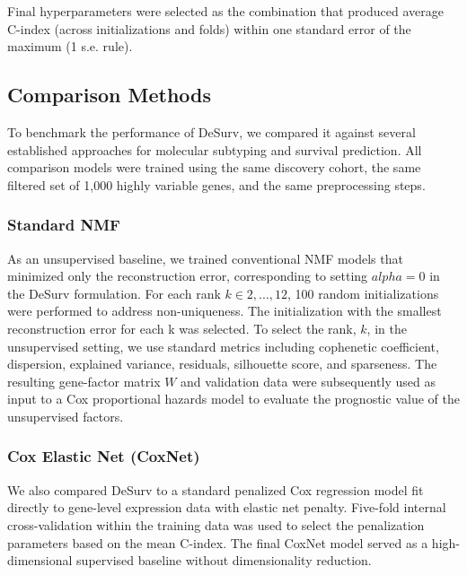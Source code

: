\documentclass[9pt,twocolumn,twoside,]{pnas-new}
\begin{document}
Final hyperparameters were selected as the combination that produced
average C-index (across initializations and folds) within one standard
error of the maximum (1 s.e. rule).

\subsection*{Comparison Methods}\label{comparison-methods}

To benchmark the performance of DeSurv, we compared it against several
established approaches for molecular subtyping and survival prediction.
All comparison models were trained using the same discovery cohort, the
same filtered set of 1,000 highly variable genes, and the same
preprocessing steps.

\subsubsection*{Standard NMF}\label{standard-nmf}

As an unsupervised baseline, we trained conventional NMF models that
minimized only the reconstruction error, corresponding to setting
\(alpha=0\) in the DeSurv formulation. For each rank
\(k \in {2,...,12}\), 100 random initializations were performed to
address non-uniqueness. The initialization with the smallest
reconstruction error for each k was selected. To select the rank, \(k\),
in the unsupervised setting, we use standard metrics including
cophenetic coefficient, dispersion, explained variance, residuals,
silhouette score, and sparseness. The resulting gene-factor matrix \(W\)
and validation data were subsequently used as input to a Cox
proportional hazards model to evaluate the prognostic value of the
unsupervised factors.

\subsubsection*{Cox Elastic Net (CoxNet)}\label{cox-elastic-net-coxnet}

We also compared DeSurv to a standard penalized Cox regression model fit
directly to gene-level expression data with elastic net penalty.
Five-fold internal cross-validation within the training data was used to
select the penalization parameters based on the mean C-index. The final
CoxNet model served as a high-dimensional supervised baseline without
dimensionality reduction.
\end{document}
